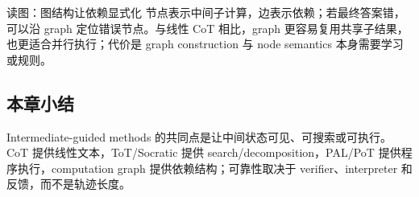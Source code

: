 
\begin{knowledgebox}{读图：图结构让依赖显式化}
节点表示中间子计算，边表示依赖；若最终答案错，可以沿 graph 定位错误节点。与线性 CoT 相比，graph 更容易复用共享子结果，也更适合并行执行；代价是 graph construction 与 node semantics 本身需要学习或规则。
\end{knowledgebox}

\subsection{本章小结}

Intermediate-guided methods 的共同点是让中间状态可见、可搜索或可执行。CoT 提供线性文本，ToT/Socratic 提供 search/decomposition，PAL/PoT 提供程序执行，computation graph 提供依赖结构；可靠性取决于 verifier、interpreter 和反馈，而不是轨迹长度。


